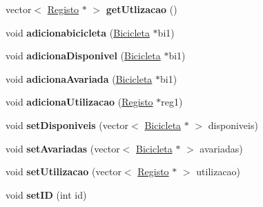 \begin{DoxyCompactItemize}
\item 
\hypertarget{class_posto_servico_abfe611099f0fb1d79f7a2344496af023}{vector$<$ \hyperlink{class_registo}{Registo} $\ast$ $>$ {\bfseries get\+Utlizacao} ()}\label{class_posto_servico_abfe611099f0fb1d79f7a2344496af023}

\item 
\hypertarget{class_posto_servico_afceba43d75e3b42c54cc6e8ff59ff22f}{void {\bfseries adicionabicicleta} (\hyperlink{class_bicicleta}{Bicicleta} $\ast$bi1)}\label{class_posto_servico_afceba43d75e3b42c54cc6e8ff59ff22f}

\item 
\hypertarget{class_posto_servico_a1b250081e0af407dc3ea0e7755da99a2}{void {\bfseries adiciona\+Disponivel} (\hyperlink{class_bicicleta}{Bicicleta} $\ast$bi1)}\label{class_posto_servico_a1b250081e0af407dc3ea0e7755da99a2}

\item 
\hypertarget{class_posto_servico_a2e01d6a12f30c50ca8c6d2eb50b33e0e}{void {\bfseries adiciona\+Avariada} (\hyperlink{class_bicicleta}{Bicicleta} $\ast$bi1)}\label{class_posto_servico_a2e01d6a12f30c50ca8c6d2eb50b33e0e}

\item 
\hypertarget{class_posto_servico_a0371ddda624f3760c76f04a4b6e767d0}{void {\bfseries adiciona\+Utilizacao} (\hyperlink{class_registo}{Registo} $\ast$reg1)}\label{class_posto_servico_a0371ddda624f3760c76f04a4b6e767d0}

\item 
\hypertarget{class_posto_servico_a0ee0fe238467db3ea6f207d528a6e2e9}{void {\bfseries set\+Disponiveis} (vector$<$ \hyperlink{class_bicicleta}{Bicicleta} $\ast$ $>$ disponiveis)}\label{class_posto_servico_a0ee0fe238467db3ea6f207d528a6e2e9}

\item 
\hypertarget{class_posto_servico_afb5c121f880c880bdcc75033eb9bc7f2}{void {\bfseries set\+Avariadas} (vector$<$ \hyperlink{class_bicicleta}{Bicicleta} $\ast$ $>$ avariadas)}\label{class_posto_servico_afb5c121f880c880bdcc75033eb9bc7f2}

\item 
\hypertarget{class_posto_servico_ae63f7836c55f4eb38d8916c140f62162}{void {\bfseries set\+Utilizacao} (vector$<$ \hyperlink{class_registo}{Registo} $\ast$ $>$ utilizacao)}\label{class_posto_servico_ae63f7836c55f4eb38d8916c140f62162}

\item 
\hypertarget{class_posto_servico_a68ca412e4456c344981f6cb0b01c4184}{void {\bfseries set\+I\+D} (int id)}\label{class_posto_servico_a68ca412e4456c344981f6cb0b01c4184}


\end{DoxyCompactItemize}
